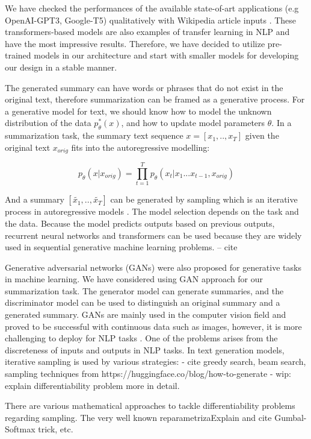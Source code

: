 \documentclass[11pt]{article}
\begin{document}
We have checked the performances of the available state-of-art applications (e.g OpenAI-GPT3, Google-T5) qualitatively with Wikipedia article inputs  \cite{gpt3,t5}. These transformers-based models are also examples of transfer learning in NLP and have the most impressive results. Therefore, we have decided to utilize pre-trained models in our architecture and start with smaller models for developing our design in a stable manner.

The generated summary can have words or phrases that do not exist in the original text, therefore summarization can be framed as a generative process. For a generative model for text, we should know how to model the unknown distribution of the data $p^*_{\theta}(x)$, and how to update model parameters {$\theta$}. In a summarization task, the summary text sequence $ x = [x_1, .. , x_T]$ given the original text $x_{orig}$ fits into the autoregressive modelling: 

\begin{equation}
p_{\theta}(x| x_{orig}) = \prod_{t=1}^{T} p_{\theta}(x_t | x_1 ... x_{t-1}, x_{orig})
\end{equation}

And a summary $[\tilde{x_1}, .., \tilde{x_T}]$ can be generated by sampling which is an iterative process in autoregressive models \cite{languagegan}. The model selection depends on the task and the data. Because the model predicts outputs based on previous outputs, recurrent neural networks and transformers can be used because they are widely used in sequential generative machine learning problems. -- cite

Generative adversarial networks (GANs) were also proposed for generative tasks \cite{goodfellow2014generative} in machine learning. We have considered using GAN approach for our summarization task. The generator model can generate summaries, and the discriminator model can be used to distinguish an original summary and a generated summary. GANs are mainly used in the computer vision field and proved to be successful with continuous data such as images, however, it is more challenging to deploy for NLP tasks \cite{deepadv4nlp}. One of the problems arises from the discreteness of inputs and outputs in NLP tasks. In text generation models, iterative sampling is used by various strategies:  - cite greedy search, beam search, sampling techniques from https://huggingface.co/blog/how-to-generate - wip: explain differentiability problem more in detail. 

There are various mathematical approaches to tackle differentiability problems regarding sampling. The very well known reparametrizaExplain and cite Gumbal-Softmax trick, etc.
\end{document}
